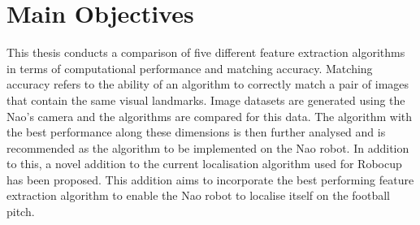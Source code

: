 \section{Main Objectives}
\label{sec:objectives}
This thesis conducts a comparison of five different feature extraction algorithms in terms of computational performance and matching accuracy. Matching accuracy refers to the ability of an algorithm to correctly match a pair of images that contain the same visual landmarks. Image datasets are generated using the Nao's camera and the algorithms are compared for this data. The algorithm with the best performance along these dimensions is then further analysed and is recommended as the algorithm to be implemented on the Nao robot. In addition to this, a novel addition to the current localisation algorithm used for Robocup has been proposed. This addition aims to incorporate the best performing feature extraction algorithm to enable the Nao robot to localise itself on the football pitch.\\


%
%
%
%
%

